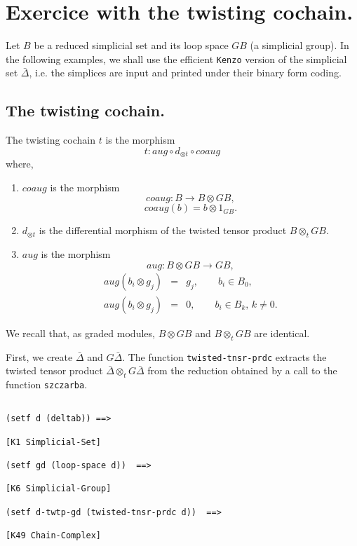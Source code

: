\newpage

\section{Exercice with the twisting cochain.}

Let $B$ be a reduced simplicial set and its loop space $GB$ (a simplicial group).
In the following examples, we shall use the efficient {\tt Kenzo}
version of the simplicial set $\bar{\Delta}$, i.e. the simplices are input
and printed under their binary form coding.

\subsection {The twisting cochain.}

The twisting cochain $t$ is the morphism
$$t: aug \circ d_{\otimes t} \circ coaug$$
where,
\begin{enumerate}
\item $coaug$ is the morphism
$$ coaug: B \rightarrow B \otimes GB,$$
$$ coaug(b) = b \otimes 1_{GB}. $$
\item $d_{\otimes t}$ is the differential morphism of the twisted tensor product
$B \otimes_t GB$.
\item $aug$ is the morphism
$$aug: B \otimes GB  \longrightarrow GB ,  $$
\begin{eqnarray*}
aug(b_i \otimes g_j)&  = & g_j, \qquad b_i \in B_0, \\
aug(b_i \otimes g_j)&  = & 0, \qquad b_i \in B_k,\, k\not=0.
\end{eqnarray*}
\end{enumerate}
We recall that, as graded modules, $B\otimes GB$ and $B \otimes_t GB$ are
identical.
\par
First, we create $\bar{\Delta}$ and $G\bar{\Delta}$. The function {\tt twisted-tnsr-prdc}
extracts the twisted tensor product $\bar{\Delta} \otimes_t G\bar{\Delta}$ from
the reduction obtained by a call to the function {\tt szczarba}.
{\footnotesize\begin{verbatim}

(setf d (deltab)) ==>

[K1 Simplicial-Set]

(setf gd (loop-space d))  ==>

[K6 Simplicial-Group]

(setf d-twtp-gd (twisted-tnsr-prdc d))  ==>

[K49 Chain-Complex]
\end{verbatim}}
